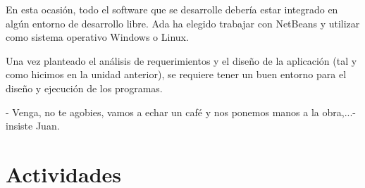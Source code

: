 En esta ocasión, todo el software que se desarrolle debería estar integrado en algún entorno de desarrollo libre. Ada ha elegido trabajar con NetBeans y utilizar como sistema operativo Windows o Linux.

Una vez planteado el análisis de requerimientos y el diseño de la aplicación (tal y como hicimos en la unidad anterior), se requiere tener un buen entorno para el diseño y ejecución de los programas.

- Venga, no te agobies, vamos a echar un café y nos ponemos manos a la obra,...- insiste Juan.

\section{Actividades}



\newpage



